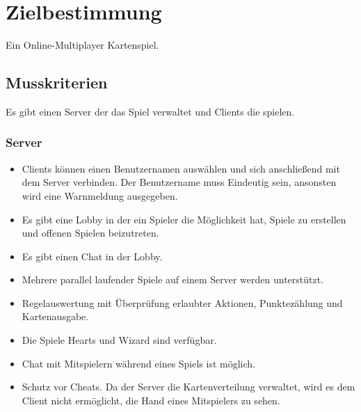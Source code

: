 \documentclass{article}
\begin{document}
\tableofcontents
\newpage

\section{Zielbestimmung}
Ein Online-Multiplayer Kartenspiel.

\subsection{Musskriterien}
Es gibt einen \gls{Server} der das Spiel verwaltet und \glspl{Client} die spielen.
\subsubsection{\gls{Server}}
\begin{itemize}
	\item \glspl{Client} können einen Benutzernamen auswählen und sich anschließend mit dem Server verbinden.
		Der Benutzername muss Eindeutig sein, ansonsten wird eine Warnmeldung ausgegeben.
	\item Es gibt eine \gls{Lobby} in der ein Spieler die Möglichkeit hat, Spiele zu erstellen und offenen Spielen beizutreten.
	\item Es gibt einen Chat in der \gls{Lobby}.
	\item Mehrere parallel laufender Spiele auf einem Server werden unterstützt.
	\item Regelauswertung mit Überprüfung erlaubter Aktionen, Punktezählung und  Kartenausgabe.
	\item Die Spiele Hearts und Wizard sind verfügbar.	
	\item Chat mit Mitspielern während eines Spiels ist möglich.
	\item Schutz vor Cheats. Da der Server die Kartenverteilung verwaltet, wird es dem Client nicht ermöglicht, die Hand 
		eines Mitspielers zu sehen.
\end{itemize}
\end{document}
